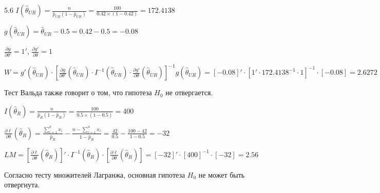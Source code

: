 \begin{solution}{{5.6}}
$I(\hat{\theta}_{UR}) = \frac{n}{\hat{p}_{UR}(1-\hat{p}_{UR})} = \frac{100}{0.42 \times (1 - 0.42)} = 172.4138$

$g(\hat{\theta}_{UR}) = \hat{\theta}_{UR} - 0.5 = 0.42 - 0.5 = -0.08$

$\frac{\partial g}{\partial \theta'} = 1'$, $\frac{\partial g'}{\partial \theta} = 1$

$W = g'(\hat{\theta}_{UR}) \cdot \left[ \frac{\partial g}{\partial \theta'}(\hat{\theta}_{UR}) \cdot I^{-1}(\hat{\theta}_{UR}) \cdot \frac{\partial g'}{\partial \theta}(\hat{\theta}_{UR}) \right]^{-1} g(\hat{\theta}_{UR}) = [-0.08]' \cdot [1' \cdot 172.4138^{-1} \cdot 1]^{-1} \cdot [-0.08] = 2.6272$

Тест Вальда также говорит о том, что гипотеза $H_0$ не отвергается.

$I(\hat{\theta}_{R}) = \frac{n}{\hat{p}_{R}(1-\hat{p}_{R})} = \frac{100}{0.5 \times (1 - 0.5)} = 400$

$\frac{\partial \ell}{\partial \theta}(\hat{\theta}_R) = \frac{\sum_{i=1}^n x_i}{\hat{p}_R} - \frac{n - \sum_{i=1}^n x_i}{1 - \hat{p}_R} = \frac{42}{0.5} - \frac{100 - 42}{1 - 0.5} = -32$

$LM = \left[ \frac{\partial \ell}{\partial \theta}(\hat{\theta}_{R}) \right]' \cdot I^{-1}(\hat{\theta}_{R}) \cdot \left[ \frac{\partial \ell}{\partial \theta}(\hat{\theta}_{R}) \right] = [-32]' \cdot [400]^{-1} \cdot [-32] = 2.56$

Согласно тесту множителей Лагранжа, основная гипотеза $H_0$ не может быть отвергнута.
\end{solution}
\protect \hypertarget {soln:5.7}{}
